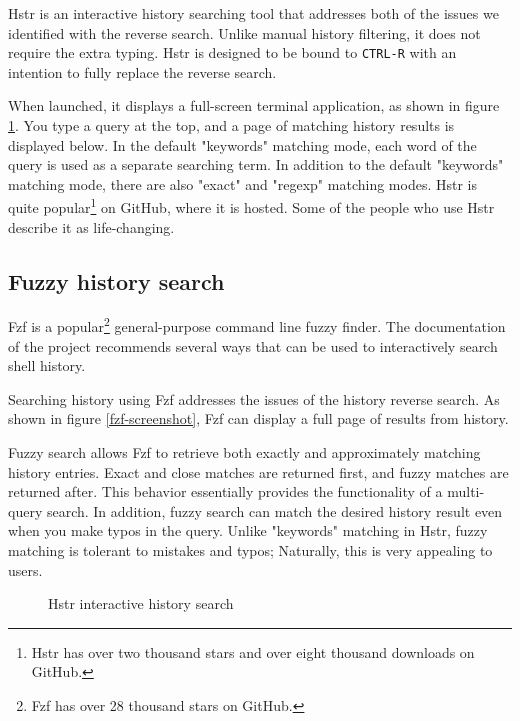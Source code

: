 Hstr\cite{toolshstr} is an interactive history searching tool that addresses both of the issues we identified with the reverse search. Unlike manual history filtering, it does not require the extra typing. Hstr is designed to be bound to \verb|CTRL-R| with an intention to fully replace the reverse search.

When launched, it displays a full-screen terminal application, as shown in figure \ref{hstr-screenshot}. You type a query at the top, and a page of matching history results is displayed below. In the default "keywords" matching mode, each word of the query is used as a separate searching term. 
In addition to the default "keywords" matching mode, there are also "exact" and "regexp" matching modes. 
Hstr is quite popular\footnote{Hstr has over two thousand stars and over eight thousand downloads on GitHub.} on GitHub, where it is hosted. Some of the people who use Hstr describe it as life-changing.


\subsection{Fuzzy history search}

Fzf\cite{tools-fzf} is a popular\footnote{Fzf has over 28 thousand stars on GitHub.} general-purpose command line fuzzy finder. The documentation of the project recommends several ways that can be used to interactively search shell history.

Searching history using Fzf addresses the issues of the history reverse search. 
As shown in figure \ref{fzf-screenshot}, Fzf can display a full page of results from history. 

Fuzzy search allows Fzf to retrieve both exactly and approximately matching history entries. Exact and close matches are returned first, and fuzzy matches are returned after. 
This behavior essentially provides the functionality of a multi-query search. In addition, fuzzy search can match the desired history result even when you make typos in the query. Unlike "keywords" matching in Hstr, fuzzy matching is tolerant to mistakes and typos; Naturally, this is very appealing to users. 

\begin{figure}[h!]
  \caption{Hstr interactive history search}
  \label{hstr-screenshot}
\end{figure}

